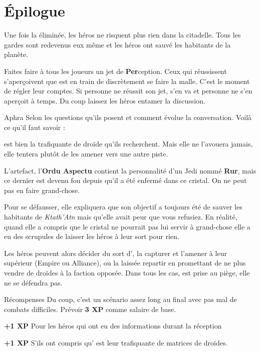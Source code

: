 \section{\'Epilogue}

Une fois la  éliminée, les héros ne risquent plus rien dans la citadelle. Tous les gardes sont redevenus eux même et les héros ont sauvé les habitants de la planète.

Faites faire à tous les joueurs un jet de \textbf{Per}ception. Ceux qui réussissent s’aperçoivent que  est en train de discrètement se faire la malle. C’est le moment de régler leur comptes. Si personne ne réussit son jet,  s’en va et personne ne s’en aperçoit à temps.
Du coup laissez les héros entamer la discussion.

\begin{paperbox}{Aphra}
Selon les questions qu’ils posent et comment évolue la conversation. Voilà ce qu’il faut savoir :

\begin{rebelist}
    \item {} est bien la trafiquante de droïde qu’ils recherchent. Mais elle ne l’avouera jamais, elle tentera plutôt de les amener vers une autre piste.
    \item L’artefact, l’\textbf{Ordu Aspectu} contient la personnalité d’un Jedi nommé \textbf{Rur}, mais ce dernier est devenu fou depuis qu’il a été enfermé dans ce cristal. On ne peut pas en faire grand-chose.
    \item Pour se défausser, elle expliquera que son objectif a toujours été de sauver les habitants de \textit{Ktath'Atn} mais qu’elle avait peur que vous refusiez. En réalité, quand elle a compris que le cristal ne pourrait pas lui servir à grand-chose elle a eu des scrupules de laisser les héros à leur sort pour rien.
\end{rebelist}
\end{paperbox}

Les héros peuvent alors décider du sort d’, la capturer et l’amener à leur supérieur (Empire ou Alliance), ou la laissée repartir en promettant de ne plus vendre de droïdes à la faction opposée. Dans tous les cas,  est prise au piège, elle ne se défendra pas.

\begin{paperbox}{Récompenses}
Du coup, c’est un scénario assez long au final avec pas mal de combats difficiles. Prévoir \textbf{3 XP} comme salaire de base.
\begin{rebelist}
    \item \textbf{+1 XP} Pour les héros qui ont eu des informations durant la réception
    \item \textbf{+1 XP} S’ils ont compris qu’ est leur trafiquante de matrices de droïdes.
\end{rebelist}
\end{paperbox}